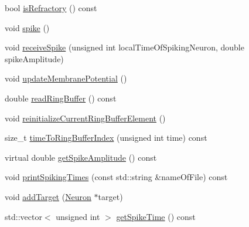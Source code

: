 \begin{DoxyCompactItemize}
bool \hyperlink{classNeuron_aa40fbb2b025efb1db420da32e16741c1}{is\-Refractory} () const 
\item 
void \hyperlink{classNeuron_a955ecfd2984f75c18664bd370c34af1d}{spike} ()
\item 
void \hyperlink{classNeuron_aa8111a347de6ddfb6c799bdcd3092cb7}{receive\-Spike} (unsigned int local\-Time\-Of\-Spiking\-Neuron, double spike\-Amplitude)
\item 
void \hyperlink{classNeuron_a41a81d8527734e59bae39f73fece887f}{update\-Membrane\-Potential} ()
\item 
double \hyperlink{classNeuron_a763493ef8eff51a638cbb75f0983b828}{read\-Ring\-Buffer} () const 
\item 
void \hyperlink{classNeuron_a41dd9577d84a48bd427201b4b8234150}{reinitialize\-Current\-Ring\-Buffer\-Element} ()
\item 
size\-\_\-t \hyperlink{classNeuron_af1c7b80b5e70e906734ce710d37b1fd7}{time\-To\-Ring\-Buffer\-Index} (unsigned int time) const 
\item 
virtual double \hyperlink{classNeuron_aec2283fbfaba764cd088e6d16b0a74bb}{get\-Spike\-Amplitude} () const 
\item 
void \hyperlink{classNeuron_a15b3eaa67535301e011d5cd8d53a61d1}{print\-Spiking\-Times} (const std\-::string \&name\-Of\-File) const 
\item 
void \hyperlink{classNeuron_a9bf071c800e76fa7fbd611cee7cd76d6}{add\-Target} (\hyperlink{classNeuron}{Neuron} $\ast$target)
\item 
std\-::vector$<$ unsigned int $>$ \hyperlink{classNeuron_a5e14b82bebab09904d558298f343061c}{get\-Spike\-Time} () const 
\end{DoxyCompactItemize}


